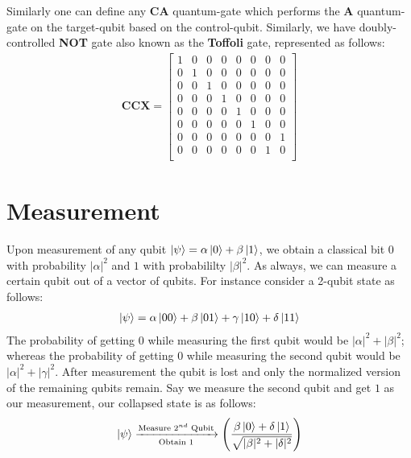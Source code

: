 Similarly one can define any \textbf{CA} quantum-gate which performs the \textbf{A} quantum-gate on the target-qubit based on the control-qubit. Similarly, 
we have doubly-controlled \textbf{NOT} gate also known as the \textbf{Toffoli} gate, represented as follows:
\begin{align}
    \mathbf{CCX} = \begin{bmatrix}
        1 & 0 & 0 & 0 & 0 & 0 & 0 & 0\\
        0 & 1 & 0 & 0 & 0 & 0 & 0 & 0\\
        0 & 0 & 1 & 0 & 0 & 0 & 0 & 0\\
        0 & 0 & 0 & 1 & 0 & 0 & 0 & 0\\
        0 & 0 & 0 & 0 & 1 & 0 & 0 & 0\\
        0 & 0 & 0 & 0 & 0 & 1 & 0 & 0\\
        0 & 0 & 0 & 0 & 0 & 0 & 0 & 1\\
        0 & 0 & 0 & 0 & 0 & 0 & 1 & 0\\
        \end{bmatrix}
\end{align}

\section{Measurement}

Upon measurement of any qubit $\ket{\psi} = \alpha\ket{0} + \beta\ket{1}$, we obtain a classical bit $0$ with probability $|\alpha|^2$ and $1$ with probabililty 
$|\beta|^2$. As always, we can measure a certain qubit out of a vector of qubits. For instance consider a 2-qubit state as follows:
\begin{align}
    \ket{\psi} = \alpha\ket{00} + \beta\ket{01} + \gamma\ket{10} + \delta\ket{11}
\end{align}
The probability of getting $0$ while measuring the first qubit would be $|\alpha|^2 + |\beta|^2$; whereas the probability of getting $0$ while measuring the second qubit 
would be $|\alpha|^2 + |\gamma|^2$. After measurement the qubit is lost and only the normalized version of the remaining qubits remain. Say we measure the second qubit and get 
$1$ as our measurement, our collapsed state is as follows:
\begin{align}
    \ket{\psi} \xrightarrow[\text{Obtain $1$}]{\text{Measure $2^{nd}$ Qubit}} \left(\frac{\beta\ket{0} + \delta\ket{1}}{\sqrt{|\beta|^2 + |\delta|^2}}\right)
\end{align}


